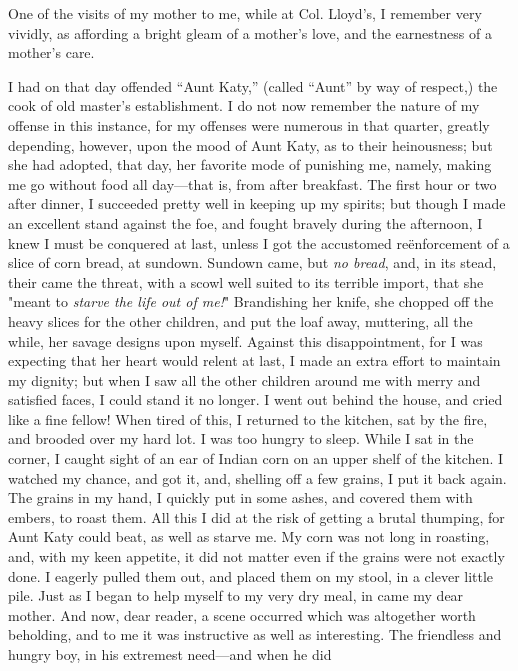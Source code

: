 One of the visits of my mother to me, while at Col. Lloyd's, I remember
very vividly, as affording a bright gleam of a mother's love, and the
earnestness of a mother's care.

I had on that day offended ``Aunt Katy,'' (called ``Aunt'' by way of
respect,) the cook of old master's establishment. I do not now remember
the nature of my offense in this instance, for my offenses were
{}numerous in that quarter, greatly depending, however, upon the mood of
Aunt Katy, as to their heinousness; but she had adopted, that day, her
favorite mode of punishing me, namely, making me go without food all
day---that is, from after breakfast. The first hour or two after dinner,
I succeeded pretty well in keeping up my spirits; but though I made an
excellent stand against the foe, and fought bravely during the
afternoon, I knew I must be conquered at last, unless I got the
accustomed reënforcement of a slice of corn bread, at sundown. Sundown
came, but \emph{no bread}, and, in its stead, their came the threat,
with a scowl well suited to its terrible import, that she "meant to
\emph{starve the life out of me!}" Brandishing her knife, she chopped
off the heavy slices for the other children, and put the loaf away,
muttering, all the while, her savage designs upon myself. Against this
disappointment, for I was expecting that her heart would relent at last,
I made an extra effort to maintain my dignity; but when I saw all the
other children around me with merry and satisfied faces, I could stand
it no longer. I went out behind the house, and cried like a fine fellow!
When tired of this, I returned to the kitchen, sat by the fire, and
brooded over my hard lot. I was too hungry to sleep. While I sat in the
corner, I caught sight of an ear of Indian corn on an upper shelf of the
kitchen. I watched my chance, and got it, and, shelling off a few
grains, I put it back again. The grains in my hand, I quickly put in
some ashes, and covered them with embers, to roast them. All this I did
at the risk of getting a brutal thumping, for Aunt Katy could beat, as
well as starve me. My corn was not long in {}roasting, and, with my keen
appetite, it did not matter even if the grains were not exactly done. I
eagerly pulled them out, and placed them on my stool, in a clever little
pile. Just as I began to help myself to my very dry meal, in came my
dear mother. And now, dear reader, a scene occurred which was altogether
worth beholding, and to me it was instructive as well as interesting.
The friendless and hungry boy, in his extremest need---and when he did
